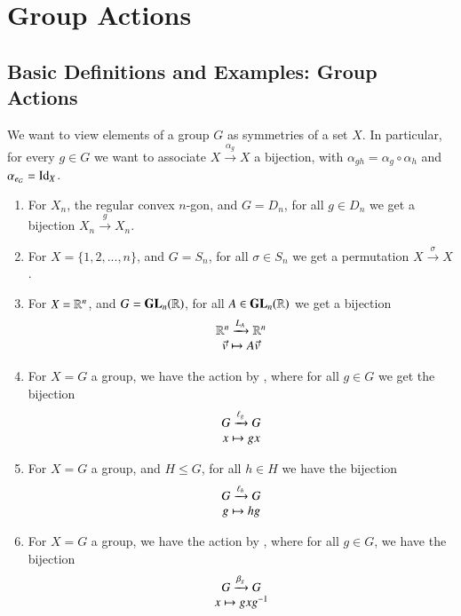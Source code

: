 \chapter{\textsection\textsection Group Actions}

\section{\textsection Basic Definitions and Examples: Group Actions}

\begin{rmk}[Motivation]
        We want to view elements of a group $G$ as symmetries of a set $X$. In particular, for every $g \in G$ we want to associate $X \xrightarrow{\alpha_g} X$ a bijection, with $\alpha_{gh} = \alpha_g \circ \alpha_h$ and $\alpha_{e_G} = \operatorname{Id}_X$.
\end{rmk}

\begin{eg}
        \leavevmode
        \begin{enumerate}
                \item For $X_n$, the regular convex $n$-gon, and $G = D_n$, for all $g \in D_n$ we get a bijection $X_n \xrightarrow{g} X_n$.
                \item For $X = \{1,2,...,n\}$, and $G = S_n$, for all $\sigma \in S_n$ we get a permutation $X \xrightarrow{\sigma} X$.
                \item For $X = \mathbb R^n$, and $G = \mathbf{GL}_n(\mathbb R)$, for all $A \in \mathbf{GL}_n(\mathbb R)$ we get a bijection \begin{equation}
                                \begin{array}{c} \mathbb R^n\xrightarrow{L_A}\mathbb R^n \\ \vec{v} \mapsto A\vec{v} \end{array}
                \end{equation}
                \item For $X = G$ a group, we have the action by , where for all $g \in G$ we get the bijection \begin{equation}
                                \begin{array}{c} G\xrightarrow{\ell_g}G \\ x\mapsto gx \end{array}
                \end{equation}
                \item For $X = G$ a group, and $H \leq G$, for all $h \in H$ we have the bijection \begin{equation}
                                \begin{array}{c} G \xrightarrow{\ell_h} G \\ g \mapsto hg \end{array}
                \end{equation}
                \item For $X = G$ a group, we have the action by , where for all $g \in G$, we have the bijection \begin{equation}
                                \begin{array}{c} G\xrightarrow{\beta_g}G \\ x\mapsto gxg^{-1} \end{array}
                \end{equation}
        \end{enumerate}
\end{eg}

